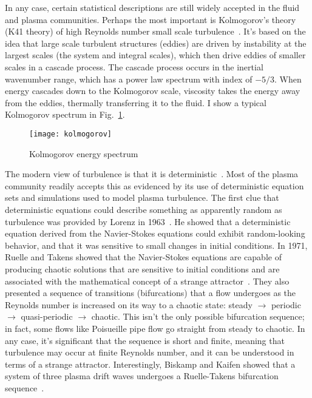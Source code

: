 In any case, certain statistical descriptions are still widely accepted in the fluid and plasma communities. Perhaps the most important is Kolmogorov's theory (K41 theory) of high Reynolds number
small scale turbulence~\cite{Kolmogorov1941,tennekes1972}. 
It's based on the idea that large scale turbulent structures (eddies) are driven by instability at the largest scales (the system and integral scales), 
which then drive eddies of smaller scales in a cascade process. The cascade process occurs in the inertial wavenumber range, which has a power law spectrum with index of $-5/3$. When energy
cascades down to the Kolmogorov scale, viscosity takes the energy away from the eddies, thermally transferring it to the fluid. I show a typical Kolmogorov spectrum in Fig.~\ref{kolmogorov}.

\begin{figure}[!ht]
\centerline{\texttt{[image: kolmogorov]}}
\caption{Kolmogorov energy spectrum}
\label{kolmogorov}
\end{figure}

The modern view of turbulence is that it is deterministic~\cite{mcdonough04}. Most of the plasma community readily accepts this as evidenced by its use of deterministic equation sets and simulations
used to model plasma turbulence. The first clue that deterministic equations could describe something as apparently random as turbulence was provided by Lorenz in 1963~\cite{lorenz1963}.
He showed that a deterministic equation derived from the Navier-Stokes equations could exhibit random-looking behavior, and that it was sensitive to small changes in initial conditions.
In 1971, Ruelle and Takens showed that the Navier-Stokes equations are capable of producing chaotic solutions that are sensitive to initial conditions and are associated with the mathematical
concept of a strange attractor~\cite{ruelle1971,mcdonough04}. They also presented a sequence of transitions (bifurcations) that a flow undergoes as the Reynolds number is increased
on its way to a chaotic state: steady $\rightarrow$ periodic $\rightarrow$ quasi-periodic $\rightarrow$ chaotic. This isn't the only possible bifurcation sequence; 
in fact, some flows like Poisueille pipe flow go straight from steady to chaotic. 
In any case, it's significant that the sequence is short and finite, meaning that turbulence may occur at finite Reynolds number, and it can be understood in terms
of a strange attractor. Interestingly, Biskamp and Kaifen showed that a system of three plasma drift waves undergoes a Ruelle-Takens bifurcation sequence~\cite{biskamp1985}.

